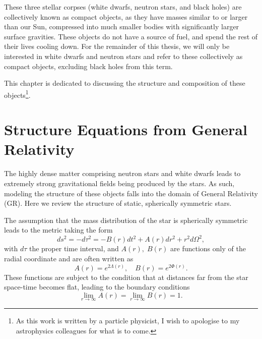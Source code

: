 These three stellar corpses (white dwarfs, neutron stars, and black holes) are collectively known as compact objects, as they have masses similar to or larger than our Sun, compressed into much smaller bodies with significantly larger surface gravities. These objects do not have a source of fuel, and spend the rest of their lives cooling down. For the remainder of this thesis, we will only be interested in white dwarfs and neutron stars and refer to these collectively as compact objects, excluding black holes from this term. 

This chapter is dedicated to discussing the structure and composition of these objects\footnote{As this work is written by a particle physicist, I wish to apologise to my astrophysics colleagues for what is to come.}.


\section{Structure Equations from General Relativity}

The highly dense matter comprising neutron stars and white dwarfs leads to extremely strong gravitational fields being produced by the stars. As such, modeling the structure of these objects falls into the domain of General Relativity (GR). Here we review the structure of static, spherically symmetric stars. 

The assumption that the mass distribution of the star is spherically symmetric leads to the metric taking the form
\begin{equation}
    ds^2 = -d\tau^2 = -B(r) dt^2 + A(r) dr^2 + r^2 d\Omega^2,
\end{equation}
with $d\tau$ the proper time interval, and $A(r),\;B(r)$ are functions only of the radial coordinate and are often written as 
\begin{equation}
    A(r) = e^{2\Lambda(r)},\quad B(r) = e^{2\Phi(r)}.
\end{equation}
These functions are subject to the condition that at distances far from the star space-time becomes flat, leading to the boundary conditions 
\begin{equation}
    \lim_{r\rightarrow \infty} A(r) = \lim_{r\rightarrow \infty} B(r)  = 1.
\end{equation}

